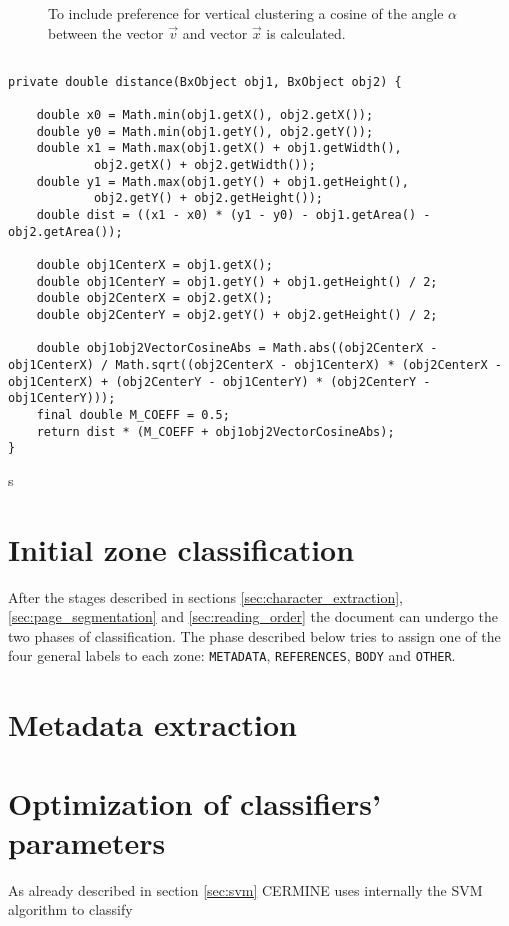 \begin{figure}[h!]
  \centering
  
  \caption{To include preference for vertical clustering a cosine of the angle $\alpha$ between the vector $\vec{v}$ and vector $\vec{x}$ is calculated.}
  \label{fig:angle_alha}
\end{figure}
\begin{lstlisting}[caption=Listing of the function measuring distance between two zones or zone groups.]

private double distance(BxObject obj1, BxObject obj2) {

    double x0 = Math.min(obj1.getX(), obj2.getX());
    double y0 = Math.min(obj1.getY(), obj2.getY());
    double x1 = Math.max(obj1.getX() + obj1.getWidth(),
            obj2.getX() + obj2.getWidth());
    double y1 = Math.max(obj1.getY() + obj1.getHeight(),
            obj2.getY() + obj2.getHeight());
    double dist = ((x1 - x0) * (y1 - y0) - obj1.getArea() - obj2.getArea());

    double obj1CenterX = obj1.getX();
    double obj1CenterY = obj1.getY() + obj1.getHeight() / 2;
    double obj2CenterX = obj2.getX();
    double obj2CenterY = obj2.getY() + obj2.getHeight() / 2;

    double obj1obj2VectorCosineAbs = Math.abs((obj2CenterX - obj1CenterX) / Math.sqrt((obj2CenterX - obj1CenterX) * (obj2CenterX - obj1CenterX) + (obj2CenterY - obj1CenterY) * (obj2CenterY - obj1CenterY)));
    final double M_COEFF = 0.5;
    return dist * (M_COEFF + obj1obj2VectorCosineAbs);
}
\end{lstlisting}s
\section{Initial zone classification}
After the stages described in sections \ref{sec:character_extraction}, \ref{sec:page_segmentation} and \ref{sec:reading_order} the document can undergo the two phases of classification. The phase described below tries to assign one of the four general labels to each zone: \verb+METADATA+, \verb+REFERENCES+, \verb+BODY+ and \verb+OTHER+.
\section{Metadata extraction}
\section{Optimization of classifiers' parameters} 
As already described in section \ref{sec:svm} CERMINE uses internally the SVM algorithm to classify  

